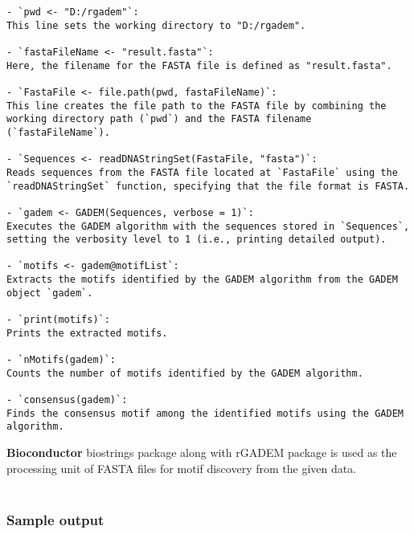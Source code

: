 \begin{lstlisting}
- `pwd <- "D:/rgadem"`: 
This line sets the working directory to "D:/rgadem".

- `fastaFileName <- "result.fasta"`: 
Here, the filename for the FASTA file is defined as "result.fasta".

- `FastaFile <- file.path(pwd, fastaFileName)`: 
This line creates the file path to the FASTA file by combining the working directory path (`pwd`) and the FASTA filename (`fastaFileName`).

- `Sequences <- readDNAStringSet(FastaFile, "fasta")`: 
Reads sequences from the FASTA file located at `FastaFile` using the `readDNAStringSet` function, specifying that the file format is FASTA.

- `gadem <- GADEM(Sequences, verbose = 1)`: 
Executes the GADEM algorithm with the sequences stored in `Sequences`, setting the verbosity level to 1 (i.e., printing detailed output).

- `motifs <- gadem@motifList`: 
Extracts the motifs identified by the GADEM algorithm from the GADEM object `gadem`.

- `print(motifs)`: 
Prints the extracted motifs.

- `nMotifs(gadem)`: 
Counts the number of motifs identified by the GADEM algorithm.

- `consensus(gadem)`: 
Finds the consensus motif among the identified motifs using the GADEM algorithm.
\end{lstlisting}
\textbf{Bioconductor} biostrings package along with rGADEM package is used as the processing unit of FASTA files for motif discovery from the given data.
\\
\\


\subsubsection{Sample output}



